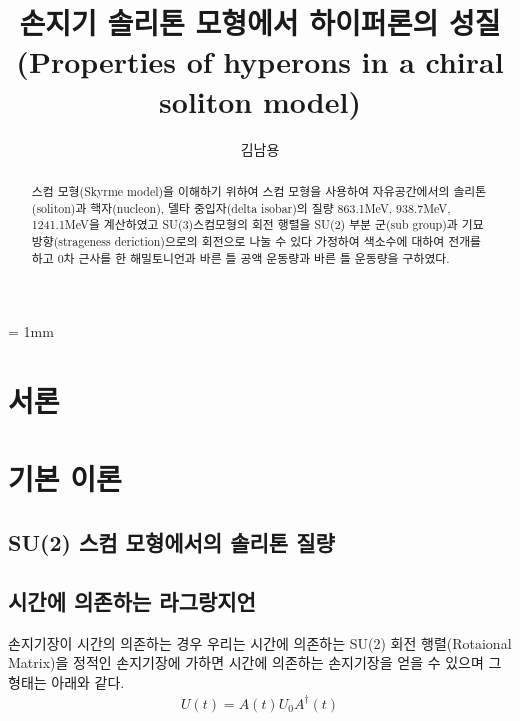 \documentclass[superscriptaddress,
nofootinbib,byrevtex,fleqn,prd,12pt]{revtex4}
\begin{document}
  \unitlength = 1mm
\title{손지기 솔리톤 모형에서 하이퍼론의 성질\\
(Properties of hyperons in a chiral soliton model)}
\author{김남용}

\begin{abstract}
   스컴 모형(Skyrme model)을 이해하기 위하여 스컴 모형을 사용하여 자유공간에서의 솔리톤(soliton)과 핵자(nucleon), 델타 중입자(delta isobar)의 질량 863.1MeV, 938.7MeV, 1241.1MeV을 계산하였고 SU(3)스컴모형의 회전 행렬을 SU(2) 부분 군(sub group)과 기묘 방향(strageness deriction)으로의 회전으로 나눌 수 있다 가정하여 색소수에 대하여 전개를 하고 0차 근사를 한 해밀토니언과 바른 틀 공액 운동량과 바른 틀 운동량을 구하였다.
\end{abstract}
\maketitle
\newcommand{\Slash}[1]{\ooalign{\hfil/\hfil\crcr$#1$}}%

\section{서론} \label{1}


\section{기본 이론} \label{2}

\subsection{SU(2) 스컴 모형에서의 솔리톤 질량}\label{21}


\subsection{시간에 의존하는 라그랑지언}\label{22}

손지기장이 시간의 의존하는 경우 우리는 시간에 의존하는 SU(2) 회전 행렬(Rotaional Matrix)을 정적인 손지기장에 가하면 시간에 의존하는 손지기장을 얻을 수 있으며 그 형태는 아래와 같다.\cite{1}
\begin{align}
  U(t) = A(t) U_{0}A^{\dagger}(t)
\end{align}
\end{document}
